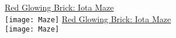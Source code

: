 \documentclass[white]{GL2020}
\begin{document}
\name{\wMazeIota{}}

\vspace*{0.5cm}
\begin{center}
{\LARGE \underline{Red Glowing Brick: Iota Maze}}\\
\vspace{0.5cm}
\texttt{[image: Maze]}
\vfill
{\LARGE \underline{Red Glowing Brick: Iota Maze}}\\
\vspace{0.5cm}
\texttt{[image: Maze]}
\end{center}
\end{document}
